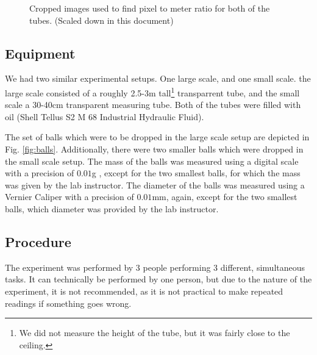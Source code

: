 \documentclass[11pt,a4paper]{article}
\begin{document}
    \begin{figure}[h]
      \center
      \caption{Cropped images used to find pixel to meter ratio for both of the tubes. (Scaled down in this document)}
      \label{fig:scale1}
    \end{figure}
  
  \subsection{Equipment}

    We had two similar experimental setups. One large scale, and one small scale. the large scale consisted of a roughly 2.5-3m tall\footnote{We did not measure the height of the tube, but it was fairly close to the ceiling.} transparrent tube, and the small scale a 30-40cm transparent measuring tube. Both of the tubes were filled with oil (Shell Tellus S2 M 68 Industrial Hydraulic Fluid\cite{_shell_????}).

    The set of balls which were to be dropped in the large scale setup are depicted in Fig. \ref{fig:balls}. Additionally, there were two smaller balls which were dropped in the small scale setup. The mass of the balls was measured using a digital scale with a precision of $0.01$g \cite{_proscale_????}, except for the two smallest balls, for which the mass was given by the lab instructor. The diameter of the balls was measured using a Vernier Caliper with a precision of $0.01$mm, again, except for the two smallest balls, which diameter was provided by the lab instructor.

  \subsection{Procedure}
    The experiment was performed by 3 people performing 3 different, simultaneous tasks. It can technically be performed by one person, but due to the nature of the experiment, it is not recommended, as it is not practical to make repeated readings if something goes wrong.
\end{document}
